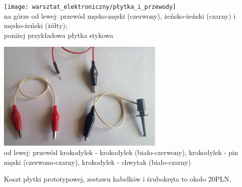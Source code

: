 \vspace{12pt}
	\parbox[c]{0.45\textwidth}{
		\texttt{[image: warsztat\_elektroniczny/płytka\_i\_przewody]}\footnotesize
		\\na górze od lewej: przewód męsko-męski (czerwony), żeńsko-żeński (czarny) i męsko-żeński (żółty);
		\\poniżej przykładowa płytka stykowa
	}
	\parbox[c]{0.45\textwidth}{
		\includegraphics[height=5.3cm]{warsztat_elektroniczny/krokodylki}\footnotesize
		\\od lewej: przewód krokodylek - krokodylek (biało-czerwony), krokodylek - pin męski (czerwono-czarny), krokodylek - chwytak (biało-czarny)
	}
\vspace{12pt}

Koszt płytki prototypowej, zestawu kabelków i śrubokręta to około 20PLN.
